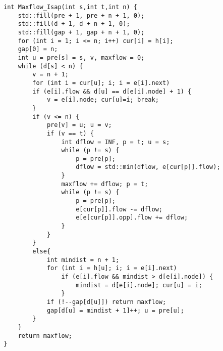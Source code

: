 \begin{lstlisting}
int Maxflow_Isap(int s,int t,int n) {
	std::fill(pre + 1, pre + n + 1, 0);
	std::fill(d + 1, d + n + 1, 0);
	std::fill(gap + 1, gap + n + 1, 0);
	for (int i = 1; i <= n; i++) cur[i] = h[i];
	gap[0] = n;
	int u = pre[s] = s, v, maxflow = 0;
	while (d[s] < n) {
		v = n + 1;
		for (int i = cur[u]; i; i = e[i].next)
		if (e[i].flow && d[u] == d[e[i].node] + 1) {
			v = e[i].node; cur[u]=i; break;
		}
		if (v <= n) {
			pre[v] = u; u = v;
			if (v == t) {
				int dflow = INF, p = t; u = s;
				while (p != s) {
					p = pre[p];
					dflow = std::min(dflow, e[cur[p]].flow);
				}
				maxflow += dflow; p = t;
				while (p != s) {
					p = pre[p];
					e[cur[p]].flow -= dflow;
					e[e[cur[p]].opp].flow += dflow;
				}
			}
		}
		else{
			int mindist = n + 1;
			for (int i = h[u]; i; i = e[i].next)
				if (e[i].flow && mindist > d[e[i].node]) {
					mindist = d[e[i].node]; cur[u] = i;
				}
			if (!--gap[d[u]]) return maxflow;
			gap[d[u] = mindist + 1]++; u = pre[u];
		}
	}
	return maxflow;
}
\end{lstlisting}

